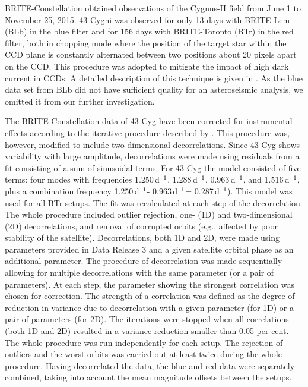 \documentclass{aa}
\def\cd{d$^{\rm -1}$}
\begin{document}
BRITE-Constellation obtained observations of the Cygnus-II field from June 1 to November 25, 2015. 43 Cygni was observed for only 13 days with BRITE-Lem (BLb) in the blue filter and for 156 days with BRITE-Toronto (BTr) in the red filter, both in chopping mode where the position of the target star within the CCD plane
is constantly alternated between two positions about 20 pixels apart on the CCD. This procedure was adopted to mitigate the impact of high dark current in CCDs. A detailed description of this technique is given in \citet{popowicz2017}. 
As the blue data set from BLb did not have sufficient quality for an asteroseismic analysis, we omitted it from our further investigation.



The BRITE-Constellation data of 43 Cyg have been corrected for instrumental effects according to the iterative procedure described by \citet{pigulski2016}. This procedure was, however, modified to include two-dimensional decorrelations. Since 43 Cyg shows variability with large amplitude, decorrelations were made using residuals from a fit consisting of a sum of sinusoidal terms.
For 43 Cyg the model consisted of five terms: four modes with frequencies 1.250\,\cd, 1.288\,\cd, 0.963\,\cd, and 1.516\,\cd, plus a combination frequency 1.250\,\cd - 0.963\,\cd = 0.287\,\cd). This model was used for all BTr setups. 
The fit was recalculated at each step of the decorrelation. The whole procedure included outlier rejection, one- (1D) and two-dimensional (2D) decorrelations, and removal of corrupted orbits (e.g., affected by poor stability of the satellite). Decorrelations, both 1D and 2D, were made using parameters provided in Data Release 3 \citep[see][or the BRITE Public Data Archive\footnote{https://brite.camk.edu.pl/pub/index.html} for the explanation of parameters]{popowicz2017} and a given satellite orbital phase as an additional parameter. The procedure of decorrelation was made sequentially allowing for multiple decorrelations with the same parameter (or a pair of parameters). At each step, the parameter showing the strongest correlation was chosen for correction. The strength of a correlation was defined as the degree of reduction in variance due to decorrelation with a given parameter (for 1D) or a pair of parameters (for 2D). The iterations were stopped when all correlations (both 1D and 2D) resulted in a variance reduction smaller than 0.05 per cent. The whole procedure was run independently for each setup. The rejection of outliers and the worst orbits was carried out at least twice during the whole procedure. Having decorrelated the data, the blue and red data were separately combined, taking into account the  mean magnitude offsets between the setups.
\end{document}
